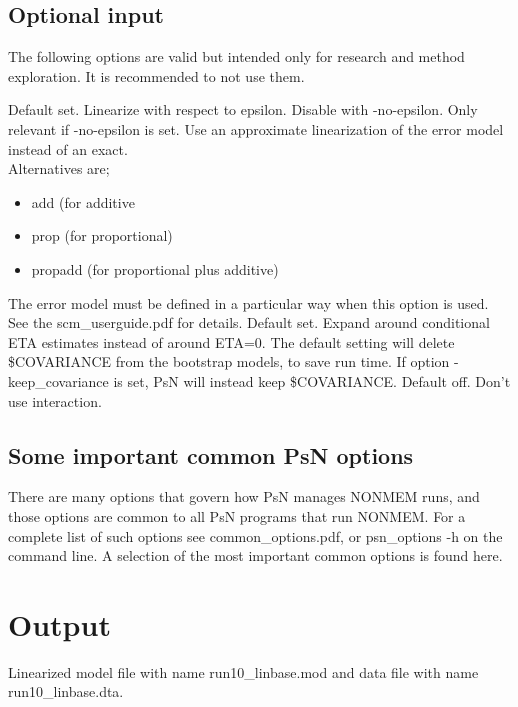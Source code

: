 \subsection{Optional input}
The following options are valid but intended only for research and method exploration. It is recommended to not use them.
\begin{optionlist}
Default set. Linearize with respect to epsilon. Disable with -no-epsilon.
\nextopt
{}
Only relevant if -no-epsilon is set. Use an approximate linearization of the error model instead of an exact.\\
Alternatives are;
\begin{itemize}
\item add (for additive
\item prop (for proportional)
\item propadd (for proportional plus additive)
\end{itemize}
The error model must be defined in a particular way when this option is used. See the scm\_userguide.pdf for details.
\nextopt
{}
Default set. Expand around conditional ETA estimates instead of around ETA=0.  
\nextopt
{}
The default setting will delete \$COVARIANCE from the bootstrap models, to save run time. If option -keep\_covariance is set, PsN will instead keep \$COVARIANCE.
\nextopt
{}
Default off. Don't use interaction. 
\nextopt
\end{optionlist}

\subsection{Some important common PsN options}
There are many options that govern how PsN manages NONMEM runs, and those options are common to all PsN programs that run NONMEM. For a complete list of such options see common\_options.pdf, or psn\_options -h on the command line. A selection of
the most important common options is found here.


\section{Output}
Linearized model file with name run10\_linbase.mod and data file with name run10\_linbase.dta.



